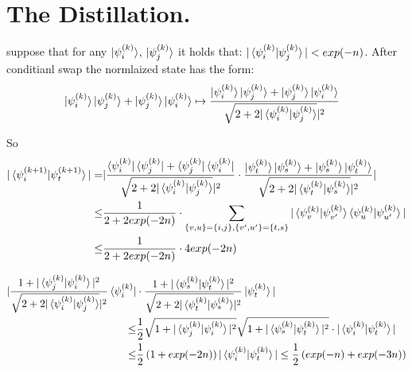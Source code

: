 \documentclass[manuscript,screen,review]{acmart}
\begin{document}
\section{The Distillation.}
suppose that for any $\ket{\psi^{(k)}_{i}}$, $\ket{\psi^{(k)}_{j}}$ it holds that: $|\braket{\psi^{(k)}_{i}|\psi^{(k)}_{j}}| < exp(-n)$. After conditianl swap the normlaized state has the form:  
\begin{equation*}
  \begin{split}
    & \ket{\psi^{(k)}_{i}}\ket{\psi^{(k)}_{j}}+\ket{\psi^{(k)}_{j}}\ket{\psi^{(k)}_{i}} \mapsto \frac{ \ket{\psi^{(k)}_{i}}\ket{\psi^{(k)}_{j}}+\ket{\psi^{(k)}_{j}}\ket{\psi^{(k)}_{i}} }{ \sqrt{2 + 2 |\braket{\psi^{(k)}_{i}|\psi^{(k)}_{j}}}|^2 } 
  \end{split}
\end{equation*}

So 
\begin{equation*}
  \begin{split}
  |\braket{\psi^{(k+1)}_{i}|\psi^{(k+1)}_{t}}| =& | \frac{ \bra{\psi^{(k)}_{i}}\bra{\psi^{(k)}_{j}}+\bra{\psi^{(k)}_{j}}\bra{\psi^{(k)}_{i}} }{ \sqrt{2 + 2 |\braket{\psi^{(k)}_{i}|\psi^{(k)}_{j}}}|^2 } \cdot \frac{ \ket{\psi^{(k)}_{t}}\ket{\psi^{(k)}_{s}}+\ket{\psi^{(k)}_{s}}\ket{\psi^{(k)}_{t}} }{ \sqrt{2 + 2 |\braket{\psi^{(k)}_{t}|\psi^{(k)}_{s}}}|^2 } | \\
  \le & \frac{1}{2+2exp(-2n)}\cdot \sum_{\{v,u\} = \{i,j\},\{v^{\prime},u^{\prime}\} = \{t,s\}}{ |\braket{\psi^{(k)}_{v}|\psi^{(k)}_{v^{\prime}}} \braket{\psi^{(k)}_{u}|\psi^{(k)}_{u^{\prime}}}|} \\ 
  \le &\frac{1}{2+2exp(-2n)} \cdot 4 exp(-2n)
  \end{split}
\end{equation*}



\begin{equation*}
  \begin{split}
     |\frac{ 1 + |\braket{\psi^{(k)}_{j}|\psi^{(k)}_{i}}|^2 }{ \sqrt{2 + 2 |\braket{\psi^{(k)}_{i}|\psi^{(k)}_{j}}}|^2 }\bra{\psi^{(k)}_{i}} & \cdot \frac{ 1 + |\braket{\psi^{(k)}_{s}|\psi^{(k)}_{t}}|^2 }{ \sqrt{2 + 2 |\braket{\psi^{(k)}_{t}|\psi^{(k)}_{s}}}|^2 }\ket{\psi^{(k)}_{t}} | \\ 
     \le &\frac{1}{2} \sqrt{1 + |\braket{\psi^{(k)}_{j}|\psi^{(k)}_{i}}|^2} \sqrt{1 + |\braket{\psi^{(k)}_{s}|\psi^{(k)}_{t}}|^2}\cdot | \braket{\psi^{(k)}_{i}|\psi^{(k)}_{t}} | \\
     \le & \frac{1}{2}\left(1+exp(-2n)\right)|\braket{\psi^{(k)}_{i}|\psi^{(k)}_{t}} | \le \frac{1}{2}\left( exp(-n) + exp(-3n) \right) 
  \end{split}
\end{equation*}
\end{document}
